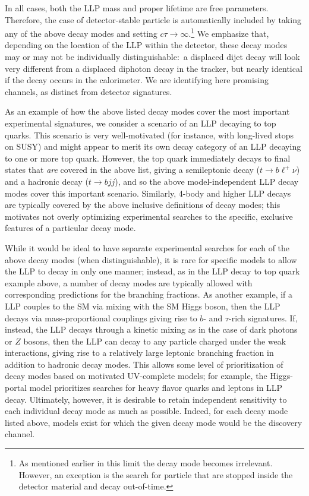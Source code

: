 In all cases, both the LLP mass and proper lifetime are free
parameters.  Therefore, the case of detector-stable particle is automatically included by taking
any of the above decay modes and setting $c\tau\rightarrow\infty$.\footnote{As mentioned 
earlier in this limit the decay mode becomes 
irrelevant. However, an exception is the search for particle that are stopped 
inside the detector material and decay out-of-time.}
We emphasize that, depending on the location of the LLP within the
detector, these decay modes may or may not be individually
distinguishable:~a displaced dijet decay will look very different from
a displaced diphoton decay in the tracker, but nearly identical if the
decay occurs in the calorimeter.  We are identifying here promising
channels, as distinct from detector signatures. 

As an example of how the above listed decay modes cover the most important
experimental signatures, we consider a scenario of an LLP decaying to
top quarks. This scenario is very well-motivated (for instance, with
long-lived stops on SUSY) and might appear to merit its own decay
category of an LLP decaying to one or more top quark. However, the top quark immediately decays to final states
that \emph{are} covered in the above list, giving a semileptonic
decay ($t\rightarrow b\ell^+\nu$) and a hadronic decay ($t\rightarrow
bjj$), and so the above model-independent LLP decay modes cover this
important scenario. Similarly, 4-body and higher LLP decays are typically covered
by the above inclusive definitions of decay modes; this motivates not overly 
optimizing experimental searches to the specific, exclusive features of a
particular decay mode.

While it would be ideal to have separate experimental searches for
each of the above decay modes (when distinguishable), it is rare for
specific models to allow the LLP to decay in only one manner; instead,
as in the LLP decay to top quark example above, a number of decay modes are
typically allowed with corresponding predictions for the branching
fractions. As another example, if a LLP couples to the SM via mixing with the
SM Higgs boson, then the LLP decays via mass-proportional couplings
giving rise to $b$- and $\tau$-rich signatures. If, instead, the LLP
decays through a kinetic mixing as in the case of dark photons or $Z$
bosons, then the LLP can decay to any particle charged under the weak
interactions, giving rise to a relatively large leptonic branching
fraction in addition to hadronic decay modes. This allows some level
of prioritization of decay modes based on motivated UV-complete
models; for example, the Higgs-portal model prioritizes searches for heavy flavor
quarks and leptons in LLP decay. Ultimately, however, it is desirable to retain independent
sensitivity to each individual decay mode as much as possible.  Indeed, for each decay
mode listed above, models exist  for which the given
decay mode would be the discovery channel. 
\linebreak


